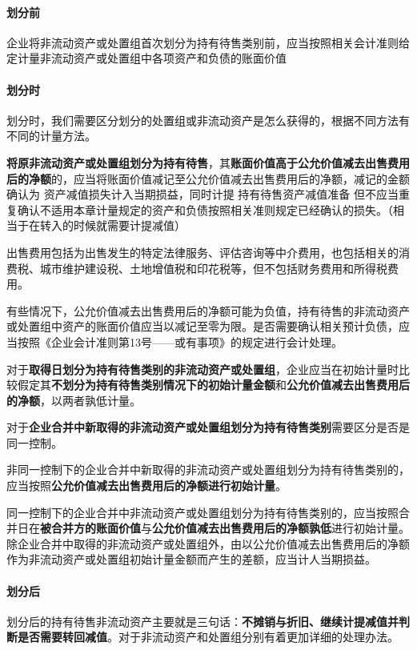 \documentclass[UTF8,12pt]{ctexart}
\numberwithin{equation}{section} %
\numberwithin{figure}{section}
\numberwithin{table}{section}
\begin{document}
	\paragraph{划分前}
	企业将非流动资产或处置组首次划分为持有待售类别前，应当按照相关会计准则给定计量非流动资产或处置组中各项资产和负债的账面价值
	
	\paragraph{划分时}
	划分时，我们需要区分划分的处置组或非流动资产是怎么获得的，根据不同方法有不同的计量方法。
	
	\textbf{将原非流动资产或处置组划分为持有待售}，其\textbf{账面价值高于公允价值减去出售费用后的净额}的，应当将账面价值减记至公允价值减去出售费用后的净额，减记的金额确认为 资产减值损失计入当期损益，同时计提 持有待售资产减值准备 但不应当重复确认不适用本章计量规定的资产和负债按照相关准则规定已经确认的损失。（相当于在转入的时候就需要计提减值）
	
	出售费用包括为出售发生的特定法律服务、评估咨询等中介费用，也包括相关的消费税、城市维护建设税、土地增值税和印花税等，但不包括财务费用和所得税费用。
	
	有些情况下，公允价值减去出售费用后的净额可能为负值，持有待售的非流动资产或处置组中资产的账面价值应当以减记至零为限。是否需要确认相关预计负债，应当按照《企业会计准则第13号——或有事项》的规定进行会计处理。
	
	对于\textbf{取得日划分为持有待售类别的非流动资产或处置组}，企业应当在初始计量时比较假定其\textbf{不划分为持有待售类别情况下的初始计量金额}和\textbf{公允价值减去出售费用后的净额}，以两者孰低计量。
	
	
	对于\textbf{企业合并中新取得的非流动资产或处置组划分为持有待售类别}需要区分是否是同一控制。
	
	非同一控制下的企业合并中新取得的非流动资产或处置组划分为持有待售类别的，应当按照\textbf{公允价值减去出售费用后的净额进行初始计量}。
	
	同一控制下的企业合并中非流动资产或处置组划分为持有待售类别的，应当按照合并日在\textbf{被合并方的账面价值}与\textbf{公允价值减去出售费用后的净额孰低}进行初始计量。除企业合并中取得的非流动资产或处置组外，由以公允价值减去出售费用后的净额作为非流动资产或处置组初始计量金额而产生的差额，应当计人当期损益。
	
	\paragraph{划分后}
	划分后的持有待售非流动资产主要就是三句话：\textbf{不摊销与折旧、继续计提减值并判断是否需要转回减值}。对于非流动资产和处置组分别有着更加详细的处理办法。
	
\end{document}
